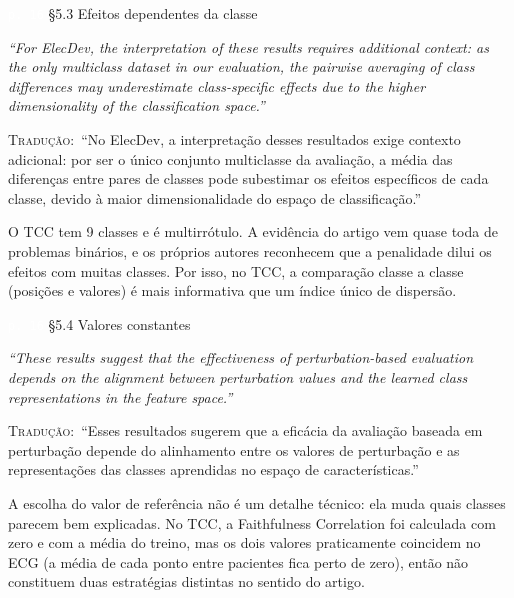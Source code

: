 \documentclass[11pt,a4paper]{article}
\newcommand{\pagechip}[1]{{\setlength{\fboxsep}{1.5pt}\colorbox{cAcc}{\textcolor{white}{\scriptsize\texttt{#1}}}}}
\newenvironment{origquote}{\par\itshape\small}{\par}
\newenvironment{tradquote}{\par\small\textsc{Tradução:}\ }{\par}
\newcommand{\explab}[1]{\par\smallskip{\small\color{cAcc}\textbf{\MakeUppercase{#1}}}\par}
\begin{document}
\begin{citacard}{\pagechip{p. 16} §5.3 Efeitos dependentes da classe}
\begin{origquote}“For ElecDev, the interpretation of these results requires additional context: as the only multiclass dataset in our evaluation, the pairwise averaging of class differences may underestimate class-specific effects due to the higher dimensionality of the classification space.”\end{origquote}
\begin{tradquote}“No ElecDev, a interpretação desses resultados exige contexto adicional: por ser o único conjunto multiclasse da avaliação, a média das diferenças entre pares de classes pode subestimar os efeitos específicos de cada classe, devido à maior dimensionalidade do espaço de classificação.”\end{tradquote}
\explab{Explicação}
O TCC tem 9 classes e é multirrótulo. A evidência do artigo vem quase toda de problemas binários, e os próprios autores reconhecem que a penalidade dilui os efeitos com muitas classes. Por isso, no TCC, a comparação classe a classe (posições e valores) é mais informativa que um índice único de dispersão.
\end{citacard}

\begin{citacard}{\pagechip{p. 16} §5.4 Valores constantes}
\begin{origquote}“These results suggest that the effectiveness of perturbation-based evaluation depends on the alignment between perturbation values and the learned class representations in the feature space.”\end{origquote}
\begin{tradquote}“Esses resultados sugerem que a eficácia da avaliação baseada em perturbação depende do alinhamento entre os valores de perturbação e as representações das classes aprendidas no espaço de características.”\end{tradquote}
\explab{Explicação}
A escolha do valor de referência não é um detalhe técnico: ela muda quais classes parecem bem explicadas. No TCC, a Faithfulness Correlation foi calculada com zero e com a média do treino, mas os dois valores praticamente coincidem no ECG (a média de cada ponto entre pacientes fica perto de zero), então não constituem duas estratégias distintas no sentido do artigo.
\end{citacard}
\end{document}
